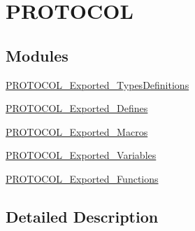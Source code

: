 \hypertarget{group___p_r_o_t_o_c_o_l}{}\section{P\+R\+O\+T\+O\+C\+OL}
\label{group___p_r_o_t_o_c_o_l}
\subsection*{Modules}
\begin{DoxyCompactItemize}
\item 
\mbox{\hyperlink{group___p_r_o_t_o_c_o_l___exported___types_definitions}{P\+R\+O\+T\+O\+C\+O\+L\+\_\+\+Exported\+\_\+\+Types\+Definitions}}
\item 
\mbox{\hyperlink{group___p_r_o_t_o_c_o_l___exported___defines}{P\+R\+O\+T\+O\+C\+O\+L\+\_\+\+Exported\+\_\+\+Defines}}
\item 
\mbox{\hyperlink{group___p_r_o_t_o_c_o_l___exported___macros}{P\+R\+O\+T\+O\+C\+O\+L\+\_\+\+Exported\+\_\+\+Macros}}
\item 
\mbox{\hyperlink{group___p_r_o_t_o_c_o_l___exported___variables}{P\+R\+O\+T\+O\+C\+O\+L\+\_\+\+Exported\+\_\+\+Variables}}
\item 
\mbox{\hyperlink{group___p_r_o_t_o_c_o_l___exported___functions}{P\+R\+O\+T\+O\+C\+O\+L\+\_\+\+Exported\+\_\+\+Functions}}
\end{DoxyCompactItemize}


\subsection{Detailed Description}
